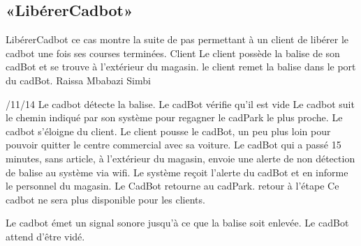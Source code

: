 \subsection{«LibérerCadbot»}
\startCU
\nom LibérerCadbot
\but ce cas montre la suite de pas permettant à un client de libérer le cadbot une fois ses courses terminées.
\acteur Client
\precondition Le client possède la balise de son cadBot et se trouve à l'extérieur du magasin.
\declenchement le client remet la balise dans le port du cadBot.
\auteur Raissa Mbabazi Simbi
\date 7/11/14
\nominal %
\startnominal
\etape[LC:SA2] Le cadbot détecte la balise.
\etape[LC:VIDE] Le cadBot vérifie qu'il est vide
\etape[LC:RETOUR] Le cadbot suit le chemin indiqué par son système pour regagner le cadPark le plus proche.
\stopnominal
\postcondition Le cadbot s'éloigne du client.
\alternatifs
\startalternatif[LC:SA2] %
\etape Le client pousse le cadBot, un peu plus loin pour pouvoir quitter le centre commercial avec sa voiture.
\etape Le cadBot qui a passé 15 minutes, sans article, à l'extérieur du magasin, envoie une alerte de non détection de balise au système via wifi.
\etape Le système reçoit l'alerte du cadBot et en informe le personnel du magasin.
\etape Le CadBot retourne au cadPark.
\etape retour à l'étape \in[LC:RETOUR]
\stopcondition
\postcondition Ce cadbot ne sera plus disponible pour les clients.
\stopalternatif




\exception

\startalternatif[LC:VIDE] %
\etape Le cadbot émet un signal sonore jusqu'à ce que la balise soit enlevée.
\stopcondition
\postcondition Le cadBot attend d'être vidé.
\stopalternatif

\stopCU
